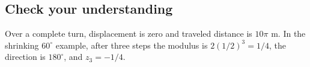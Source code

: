 \hypertarget{m10-check-your-understanding}{%
\subsection{Check your understanding}\label{m10-check-your-understanding}}

Over a complete turn, displacement is zero and traveled distance is \(10\pi\) m. In the shrinking \(60^\circ\) example, after three steps the modulus is \(2(1/2)^3=1/4\), the direction is \(180^\circ\), and \(z_3=-1/4\).

\clearpage
